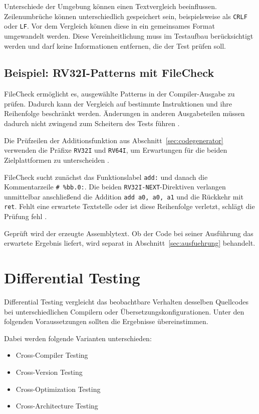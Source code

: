 \documentclass[11pt,a4paper]{article}
\newcommand{\code}[1]{\texttt{#1}}
\begin{document}
Unterschiede der Umgebung können einen Textvergleich beeinflussen. Zeilenumbrüche können unterschiedlich gespeichert sein, beispielsweise als \code{CRLF} oder \code{LF}. Vor dem Vergleich können diese in ein gemeinsames Format umgewandelt werden. Diese Vereinheitlichung muss im Testaufbau berücksichtigt werden und darf keine Informationen entfernen, die der Test prüfen soll.

\subsection{Beispiel: RV32I-Patterns mit FileCheck}
FileCheck ermöglicht es, ausgewählte Patterns in der Compiler-Ausgabe
zu prüfen. Dadurch kann der Vergleich auf bestimmte Instruktionen
und ihre Reihenfolge beschränkt werden. Änderungen in anderen
Ausgabeteilen müssen dadurch nicht zwingend zum Scheitern des Tests führen
\parencite{filecheck}.

Die Prüfzeilen der Additionsfunktion aus Abschnitt~\ref{sec:codegenerator}
verwenden die Präfixe \code{RV32I} und \code{RV64I}, um Erwartungen
für die beiden Zielplattformen zu unterscheiden \parencite{rvtest}.

FileCheck sucht zunächst das Funktionslabel \code{add:} und danach
die Kommentarzeile \code{\# \%bb.0:}. Die beiden
\code{RV32I-NEXT}-Direktiven verlangen unmittelbar anschließend
die Addition \code{add a0, a0, a1} und die Rückkehr mit \code{ret}.
Fehlt eine erwartete Textstelle oder ist diese Reihenfolge verletzt,
schlägt die Prüfung fehl \parencite{filecheck,rvtest}.

Geprüft wird der erzeugte Assemblytext. Ob der Code bei seiner
Ausführung das erwartete Ergebnis liefert, wird separat in
Abschnitt~\ref{sec:ausfuehrung} behandelt.

\section{Differential Testing}

Differential Testing vergleicht das beobachtbare Verhalten desselben Quellcodes bei unterschiedlichen Compilern oder Übersetzungskonfigurationen. Unter den folgenden Voraussetzungen sollten die Ergebnisse übereinstimmen.

Dabei werden folgende Varianten unterschieden:

\begin{itemize}
  \item Cross-Compiler Testing \parencite{terres2025}
  \item Cross-Version Testing \parencite{terres2025}
  \item Cross-Optimization Testing \parencite{terres2025}
  \item Cross-Architecture Testing \parencite{elnaggar2025}
\end{itemize}
\end{document}
